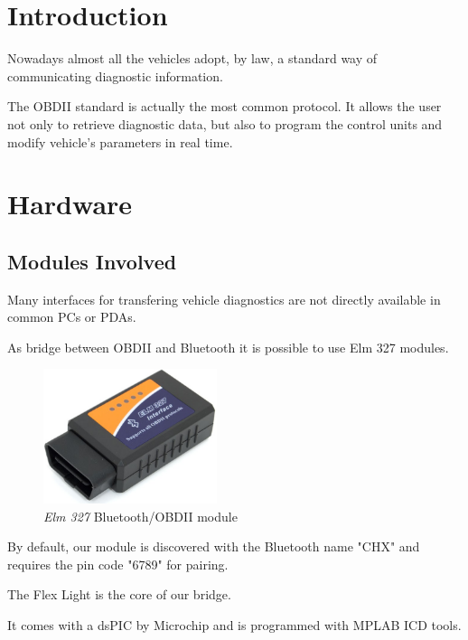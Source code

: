 \documentclass[twoside]{article}
\begin{document}
\begin{multicols}{2} %

\section{Introduction}

\lettrine[nindent=0em,lines=2]{N} owadays almost all the vehicles adopt, by law, a standard way of communicating diagnostic information.

The OBDII standard is actually the most common protocol. It allows the user not only to retrieve diagnostic data, but also to program the control units and modify vehicle's parameters in real time.


\section{Hardware}

\subsection{Modules Involved}

Many interfaces for transfering vehicle diagnostics are not directly available in common PCs or PDAs.

As bridge between OBDII and Bluetooth it is possible to use Elm 327 modules.

\begin{figure}[H]
  \centering
  \includegraphics[width=2in]{img/elm_327_presentation}
  \caption{\textit{Elm 327} Bluetooth/OBDII module}
\end{figure}

By default, our module is discovered with the Bluetooth name "CHX" and requires the pin code "6789" for pairing.

The Flex Light is the core of our bridge.

It comes with a dsPIC by Microchip and is programmed with MPLAB ICD tools.


\end{multicols}
\end{document}
